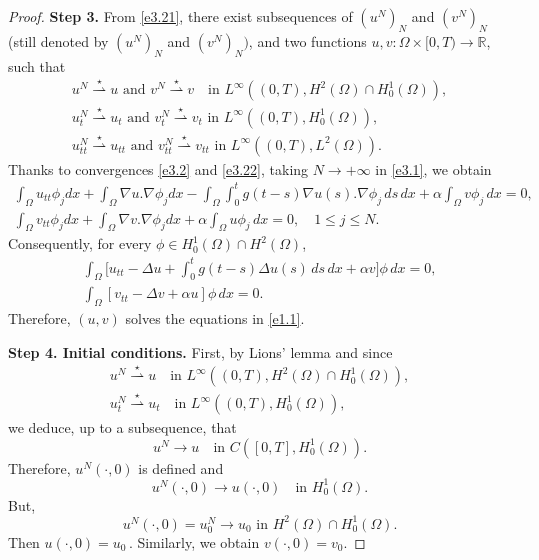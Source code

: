\documentclass[reqno]{amsart}
\begin{document}
\begin{proof}
\noindent\textbf{Step 3.}
From \eqref{e3.21}, there exist subsequences of $(u^{N})_{N}$ and $(v^{N})_{N}$
(still denoted by $(u^{N})_{N}$ and $(v^{N})_{N})$, and two functions
$u, v : \Omega \times [0, T) \to \mathbb{R}$, such that
\begin{equation}
\begin{gathered}
u^{N} \overset{\star}{\rightharpoonup} u \text{ and }
 v^{N} \overset{\star}{\rightharpoonup} v \quad \text{in }
 L^\infty((0,T), H^2(\Omega) \cap H_0^1 (\Omega)), \\
u_{t}^{N} \overset{\star}{\rightharpoonup} u_{t} \text{ and }
 v_{t}^{N} \overset{\star}{\rightharpoonup} v_{t} \text{ in } L^\infty((0,T),
 H^1_0(\Omega)), \\
 u_{tt}^{N} \overset{\star}{\rightharpoonup} u_{tt} \text{ and }
 v_{tt}^{N} \overset{\star}{\rightharpoonup} v_{tt} \text{ in }
 L^\infty((0,T), L^2(\Omega)).
\end{gathered}\label{e3.22}
\end{equation}
Thanks to convergences \eqref{e3.2} and \eqref{e3.22}, taking $N \to +\infty$
in \eqref{e3.1}, we obtain
\begin{equation}
\begin{gathered}
\int_\Omega u_{tt}\phi_j dx + \int_\Omega \nabla u .\nabla \phi_j dx
- \int_\Omega \int_0^t g(t-s) \nabla u(s) .\nabla \phi_j\, ds\, dx
+ \alpha \int_\Omega v \phi_j \, dx = 0,\\
\int_\Omega v_{tt} \phi_j dx + \int_\Omega \nabla v.\nabla \phi_j dx
+ \alpha \int_\Omega u \phi_j \, dx = 0,\quad 1\leq j\leq N.
\end{gathered} \label{e3.23}
\end{equation}
 Consequently, for every $ \phi \in H_0^1(\Omega)\cap H^2(\Omega)$,
\begin{gather*}
\int_\Omega \Big[ u_{tt}- \Delta u + \int_0^t g(t-s) \Delta u(s)\, ds\,dx
 + \alpha v\Big] \phi \, dx = 0,\\
\int_\Omega [ v_{tt} - \Delta v + \alpha u] \phi \, dx = 0.
\end{gather*}
Therefore, $(u,v)$ solves the equations in \eqref{e1.1}.
\smallskip

\noindent\textbf{Step 4. Initial conditions.}
First, by Lions' lemma \cite{Lions} and since
\begin{gather*}
u^{N} \overset{\star}{\rightharpoonup} u \quad \text{in }
 L^\infty((0,T), H^2(\Omega) \cap H_0^1 (\Omega)), \\
u_{t}^{N} \overset{\star}{\rightharpoonup} u_{t} \quad \text{in }
 L^\infty((0,T), H^1_0(\Omega)),
\end{gather*}
we deduce, up to a subsequence, that
\begin{equation}
u^{N} \to u \quad \text{in } C([0, T], H^1_0(\Omega)).\label{e3.24}
\end{equation}
Therefore, \( u^{N}(\cdot, 0) \) is defined and
\[
u^{N}(\cdot, 0) \to u(\cdot, 0) \quad \text{in } H^1_0(\Omega).
\]
But,
\[ u^{N}(\cdot, 0) = u^{N}_0 \to u_0 \,\, \text{in}\,\, H^2(\Omega) \cap H^1_0(\Omega).\] Then \( u(\cdot, 0) = u_0 \, \). Similarly, we obtain $v(\cdot, 0)=v_0. $


\end{proof}
\end{document}
